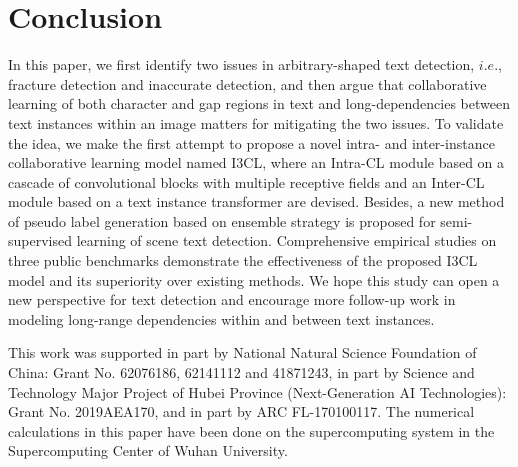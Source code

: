 \section{Conclusion}
In this paper, we first identify two issues in arbitrary-shaped text detection, $i.e.$, fracture detection and inaccurate detection, and then argue that collaborative learning of both character and gap regions in text and long-dependencies between text instances within an image matters for mitigating the two issues. To validate the idea, we make the first attempt to propose a novel intra- and inter-instance collaborative learning model named I3CL, where an Intra-CL module based on a cascade of convolutional blocks with multiple receptive fields and an Inter-CL module based on a text instance transformer are devised. Besides, a new method of pseudo label generation based on ensemble strategy is proposed for semi-supervised learning of scene text detection. Comprehensive empirical studies on three public benchmarks demonstrate the effectiveness of the proposed I3CL model and its superiority over existing methods. We hope this study can open a new perspective for text detection and encourage more follow-up work in modeling long-range dependencies within and between text instances.





\begin{acknowledgements}
This work was supported in part by National Natural Science Foundation of China: Grant No. 62076186, 62141112 and 41871243, in part by Science and Technology Major Project of Hubei Province (Next-Generation AI Technologies): Grant No. 2019AEA170, and in part by ARC FL-170100117. The numerical calculations in this paper have been done on the supercomputing system in the Supercomputing Center of Wuhan University.
\end{acknowledgements}





         




